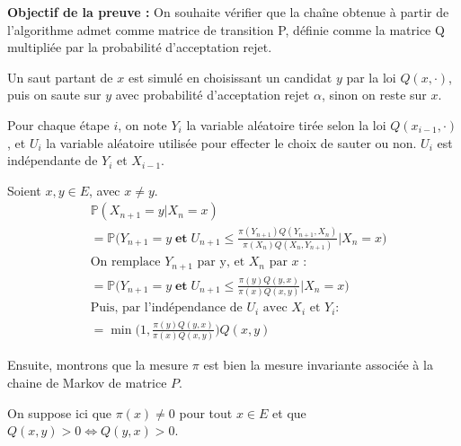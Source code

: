 \documentclass{article}
\begin{document}
\begin{tcolorbox}[colback=white,colframe=green!80!black,title=Démonstration]
    \vspace{1em}

    \textbf{Objectif de la preuve :} On souhaite vérifier que la chaîne obtenue à partir de l'algorithme admet comme matrice de transition P, définie comme la matrice Q multipliée par la probabilité d'acceptation rejet.
    \vspace{1em}

    Un saut partant de $x$ est simulé en choisissant un candidat $y$ par la loi $Q(x, \cdot)$, puis on saute sur $y$ avec probabilité d'acceptation rejet $\alpha$, sinon on reste sur $x$.
    \vspace{1em}

    Pour chaque étape $i$, on note $Y_i$ la variable aléatoire tirée selon la loi $Q(x_{i-1}, \cdot)$, et $U_i$ la variable aléatoire utilisée pour effecter le choix de sauter ou non. $U_i$ est indépendante de $Y_i$ et $X_{i-1}$.
    \vspace{1em}

    Soient $x, y \in E$, avec $x \neq y$.\\
    \begin{align*}
        &\mathbb{P}(X_{n+1} = y | X_n = x) \\
        &= \mathbb{P}\big( Y_{n+1} = y
        \mathbf{\;et\;} U_{n+1} \leq \frac{\pi(Y_{n+1}) Q(Y_{n+1}, X_n)}{\pi(X_n) Q(X_n, Y_{n+1})} \big| X_n = x \big) \\
        &\text{On remplace $Y_{n+1}$ par y, et $X_n$ par $x$ :}\\
        &= \mathbb{P}\big( Y_{n+1} = y
        \mathbf{\;et\;} U_{n+1} \leq \frac{\pi(y) Q(y, x)}{\pi(x) Q(x, y)} \big| X_n = x \big)\\
        &\text{Puis, par l'indépendance de $U_i$ avec $X_i$ et $Y_i$} :\\
        &= \min\big(1, \frac{\pi(y) Q(y, x)}{\pi(x) Q(x, y)} \big)Q(x, y)
    \end{align*}
\end{tcolorbox}

Ensuite, montrons que la mesure $\pi$ est bien la mesure invariante associée à la chaine de Markov de matrice $P$.

On suppose ici que $\pi(x) \neq 0$ pour tout $x \in E$ et que $Q(x, y) > 0 \iff Q(y, x) > 0$.
\end{document}
